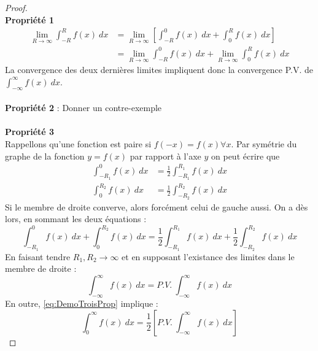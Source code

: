 	\begin{proof}\ \\
	\textbf{Propriété 1}
	\begin{equation}
		\begin{array}{ll}
	\lim\limits_{R\rightarrow\infty} \int_{-R}^R f(x)\ dx &= \lim\limits_{R\rightarrow\infty}
	\left[\int_{-R}^0 f(x)\ dx+\int_0^R f(x)\ dx\right]\\
	 &= \lim\limits_{R\rightarrow\infty} \int_{-R}^0 f(x)\ dx+ \lim\limits_{R\rightarrow\infty}
	 \int_0^R f(x)\ dx
	\end{array}
	\end{equation}
	La convergence des deux dernières limites impliquent donc la convergence P.V. de
	$\int_{-\infty}^\infty f(x)\ dx$.\ \\
	
	\ \\
	\textbf{Propriété 2} : Donner un contre-exemple\\	
	\ \\
	\textbf{Propriété 3}\\
	Rappellons qu'une fonction est paire si $f(-x)=f(x)\forall x$. Par symétrie du graphe
	de la fonction $y=f(x)$ par rapport à l'axe $y$ on peut écrire que 
	\begin{equation}
	\begin{array}{ll}
	\int_{-R_1}^0 f(x)\ dx &= \frac{1}{2}\int_{-R_1}^{R_1} f(x)\ dx\\
	\int^{R_2}_0 f(x)\ dx &= \frac{1}{2}\int_{-R_2}^{R_2} f(x)\ dx	
	\end{array}
	\label{eq:DemoTroisProp}
	\end{equation}
	Si le membre de droite converve, alors forcément celui de gauche aussi. On a dès lors, 
	en sommant les deux équations : 
	\begin{equation}
	\int_{-R_1}^0 f(x)\ dx + \int^{R_2}_0 f(x)\ dx  = \frac{1}{2}\int_{-R_1}^{R_1} f(x)\ dx
	+ \frac{1}{2}\int_{-R_2}^{R_2} f(x)\ dx	
	\end{equation}
	En faisant tendre $R_1,R_2\rightarrow\infty$ et en supposant l'existance des limites 
	dans le membre de droite :
	\begin{equation}
	\int_{-\infty}^\infty f(x)\ dx = P.V.\	\int_{-\infty}^\infty f(x)\ dx
	\end{equation}
	En outre, \autoref{eq:DemoTroisProp} implique :
	\begin{equation}
	\int_0^\infty f(x)\ dx = \frac{1}{2}\left[P.V.\	\int_{-\infty}^\infty f(x)\ dx\right]
	\end{equation}
	\end{proof}
	
